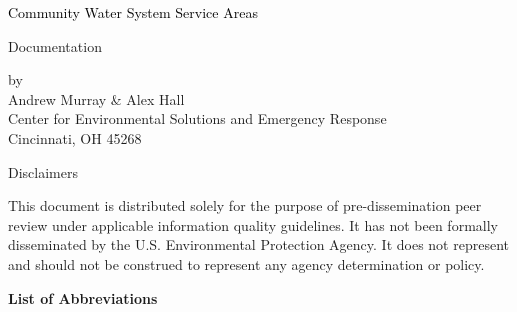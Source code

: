 \documentclass[12pt]{article}
\renewcommand*\contentsname{Table of contents}
\newcommand\contentsname{Table of contents}
\begin{document}
\clearpage
\pagecolor{white}
\thispagestyle{empty}
\hfill
\clearpage

\setcounter{page}{1}
\begin{center}

\begin{huge}
\textcolor{black}{Community Water System Service Areas}\\
\end{huge}

\normalsize Documentation

\vspace{1in}
by
\\Andrew Murray \& Alex Hall
\\Center for Environmental Solutions and Emergency Response
\\Cincinnati, OH 45268
\end{center}
\clearpage


\begin{center}
\huge Disclaimers\\
\end{center}

\normalsize

This document is distributed solely for the purpose of pre-dissemination
peer review under applicable information quality guidelines. It has not
been formally disseminated by the U.S. Environmental Protection Agency.
It does not represent and should not be construed to represent any
agency determination or policy.

\clearpage


% 
\renewcommand*\contentsname{Table of contents}
\hypersetup{linkcolor=blue}
\setcounter{tocdepth}{3}
\tableofcontents
\listoffigures
\listoftables

\clearpage

\Large\bfseries{List of Abbreviations}

\normalsize\mdseries
\end{document}
